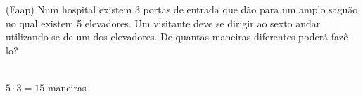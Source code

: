 \begin{ex}
(Faap) Num hospital existem 3 portas de entrada que dão para um amplo saguão no qual existem 5 elevadores. Um visitante deve se dirigir ao sexto andar utilizando-se de um dos elevadores. De quantas maneiras diferentes poderá fazê-lo?
 \begin{sol}
  \phantom{A}\\
  $5\cdot3 =15$ maneiras
 \end{sol}
\end{ex}